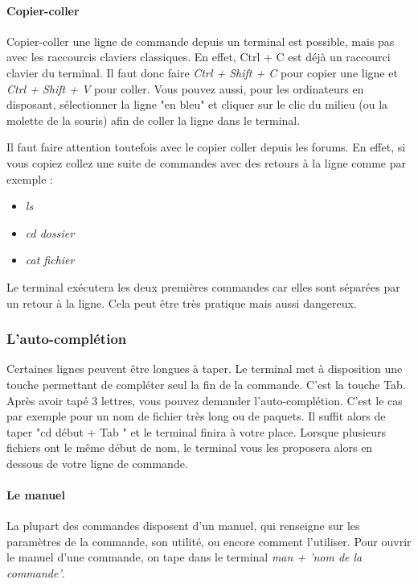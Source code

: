 \paragraph{Copier-coller}

Copier-coller une ligne de commande depuis un terminal est possible, mais pas
avec les raccourcis claviers classiques.
En effet, Ctrl + C est déjà un raccourci clavier du terminal. Il faut donc faire
\textit{Ctrl + Shift + C} pour copier une ligne et \textit{Ctrl + Shift + V}
pour coller. Vous pouvez aussi, pour les ordinateurs en disposant, sélectionner
la ligne "en bleu" et cliquer sur le clic du milieu (ou la molette de la souris)
afin de coller la ligne dans le terminal.

Il faut faire attention toutefois avec le copier coller depuis les forums. En
effet, si vous copiez collez une suite de commandes avec des retours à la ligne
comme par exemple :

\begin{itemize}
\item \textit{ls}
\item \textit{cd dossier}
\item \textit{cat fichier}
\end{itemize}

Le terminal exécutera les deux premières commandes car elles sont séparées par
un retour à la ligne. Cela peut être très pratique mais aussi dangereux.


\subsubsection{L'auto-complétion}

Certaines lignes peuvent être longues à taper. Le terminal met à disposition une
touche permettant de compléter seul la fin de la commande. C'est la touche Tab.
Après avoir tapé 3 lettres, vous pouvez demander l'auto-complétion.
C'est le cas par exemple pour un nom de fichier très long ou de paquets. Il
suffit alors de taper "cd début + Tab " et le terminal finira à votre place.
Lorsque plusieurs fichiers ont le même début de nom, le terminal vous les
proposera alors en dessous de votre ligne de commande.

\paragraph{Le manuel}
La plupart des commandes disposent d'un manuel, qui renseigne sur les paramètres
de la commande, son utilité, ou encore comment l'utiliser. Pour ouvrir le manuel
d'une commande, on tape dans le terminal \textit{man + 'nom de la commande'}.

